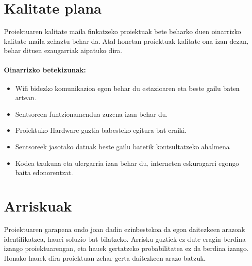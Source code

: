\section{Kalitate plana}
Proiektuaren kalitate maila finkatzeko proiektuak bete beharko duen oinarrizko kalitate maila zehaztu behar da. Atal honetan proiektuak kalitate ona izan dezan, behar dituen ezaugarriak aipatuko dira.

\paragraph{\textbf{Oinarrizko betekizunak:}}
\begin{itemize}
    \item Wifi bidezko komunikazioa egon behar du estazioaren eta beste gailu baten artean.
    \item Sentsoreen funtzionamendua zuzena izan behar du.
    \item Proiektuko Hardware guztia babesteko egitura bat eraiki.
    \item Sentsoreek jasotako datuak beste gailu batetik kontsultatzeko ahalmena
    \item Kodea txukuna eta ulergarria izan behar du, interneten eskuragarri egongo baita edonorentzat.
\end{itemize}
\section{Arriskuak}

Proiektuaren garapena ondo joan dadin ezinbestekoa da egon daitezkeen arazoak identifikatzea, hauei soluzio bat bilatzeko. Arrisku guztiek ez dute eragin berdina izango proiektuarengan, eta hauek gertatzeko probabilitatea ez da berdina izango. Honako hauek dira proiektuan zehar gerta daitezkeen arazo batzuk.


